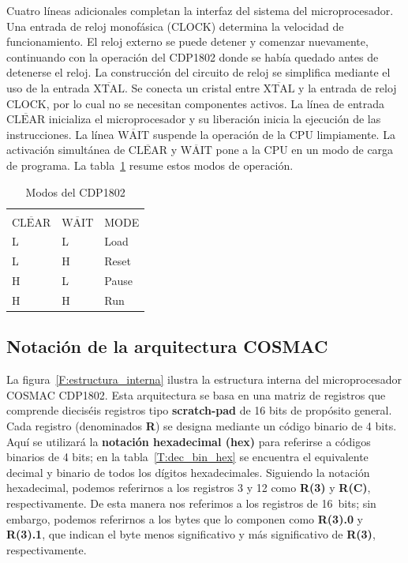 Cuatro líneas adicionales completan la interfaz del sistema del microprocesador. Una entrada de reloj monofásica (CLOCK) determina la velocidad de funcionamiento. El reloj externo se puede detener y comenzar nuevamente, continuando con la operación del CDP1802 donde se había quedado antes de detenerse el reloj. La construcción del circuito de reloj se simplifica mediante el uso de la entrada $ \overline{\text{XTAL}} $. Se conecta un cristal entre $ \overline{\text{XTAL}} $ y la entrada de reloj CLOCK, por lo cual no se necesitan componentes activos. La línea de entrada $ \overline{\text{CLEAR}} $ inicializa el microprocesador y su liberación inicia la ejecución de las instrucciones. La línea $ \overline{\text{WAIT}} $ suspende la operación de la CPU limpiamente. La activación simultánea de $ \overline{\text{CLEAR}} $ y $ \overline{\text{WAIT}} $ pone a la CPU en un modo de carga de programa. La tabla~\ref{T:CDP1802_modes} resume estos modos de operación.

\begin{table}[ht!]
\caption{Modos del CDP1802}
\label{T:CDP1802_modes}
\begin{tabular}{|l|l|l|}
\hline
      &      & \\
$ \overline{\text{CLEAR}} $ & $ \overline{\text{WAIT}} $ & MODE  \\[0.3cm] \hline
L     & L    & Load  \\
L     & H    & Reset \\
H     & L    & Pause \\
H     & H    & Run   \\ \hline
\end{tabular}
\end{table}

\subsection{Notación de la arquitectura COSMAC}

La figura~\ref{F:estructura_interna} ilustra la estructura interna del microprocesador COSMAC CDP1802. Esta arquitectura se basa en una matriz de registros que comprende dieciséis registros tipo \textbf{scratch-pad} de 16 bits de propósito general. Cada registro (denominados \textbf{R}) se designa mediante un código binario de 4 bits. Aquí se utilizará la \textbf{notación hexadecimal (hex)} para referirse a códigos binarios de 4 bits; en la tabla~\ref{T:dec_bin_hex} se encuentra el equivalente decimal y binario de todos los dígitos hexadecimales.
Siguiendo la notación hexadecimal, podemos referirnos a los registros 3 y 12 como \textbf{R(3)} y \textbf{R(C)}, respectivamente. De esta manera nos referimos a los registros de 16~bits; sin embargo, podemos referirnos a los bytes que lo componen como \textbf{R(3).0} y \textbf{R(3).1}, que indican el byte menos significativo y más significativo de \textbf{R(3)}, respectivamente.

